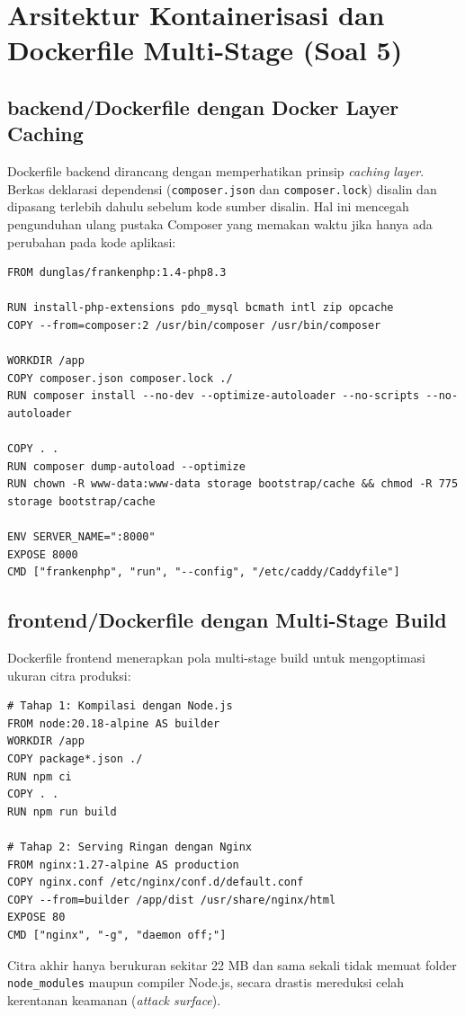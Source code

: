 \documentclass[a4paper,oneside,11pt]{book}
\begin{document}
\section{Arsitektur Kontainerisasi dan Dockerfile Multi-Stage (Soal 5)}

\subsection{backend/Dockerfile dengan Docker Layer Caching}
Dockerfile backend dirancang dengan memperhatikan prinsip \textit{caching layer}. Berkas deklarasi dependensi (\texttt{composer.json} dan \texttt{composer.lock}) disalin dan dipasang terlebih dahulu sebelum kode sumber disalin. Hal ini mencegah pengunduhan ulang pustaka Composer yang memakan waktu jika hanya ada perubahan pada kode aplikasi:
\begin{lstlisting}[style=codestyle]
FROM dunglas/frankenphp:1.4-php8.3

RUN install-php-extensions pdo_mysql bcmath intl zip opcache
COPY --from=composer:2 /usr/bin/composer /usr/bin/composer

WORKDIR /app
COPY composer.json composer.lock ./
RUN composer install --no-dev --optimize-autoloader --no-scripts --no-autoloader

COPY . .
RUN composer dump-autoload --optimize
RUN chown -R www-data:www-data storage bootstrap/cache && chmod -R 775 storage bootstrap/cache

ENV SERVER_NAME=":8000"
EXPOSE 8000
CMD ["frankenphp", "run", "--config", "/etc/caddy/Caddyfile"]
\end{lstlisting}

\subsection{frontend/Dockerfile dengan Multi-Stage Build}
Dockerfile frontend menerapkan pola multi-stage build untuk mengoptimasi ukuran citra produksi:
\begin{lstlisting}[style=codestyle]
# Tahap 1: Kompilasi dengan Node.js
FROM node:20.18-alpine AS builder
WORKDIR /app
COPY package*.json ./
RUN npm ci
COPY . .
RUN npm run build

# Tahap 2: Serving Ringan dengan Nginx
FROM nginx:1.27-alpine AS production
COPY nginx.conf /etc/nginx/conf.d/default.conf
COPY --from=builder /app/dist /usr/share/nginx/html
EXPOSE 80
CMD ["nginx", "-g", "daemon off;"]
\end{lstlisting}
Citra akhir hanya berukuran sekitar 22 MB dan sama sekali tidak memuat folder \texttt{node\_modules} maupun compiler Node.js, secara drastis mereduksi celah kerentanan keamanan (\textit{attack surface}).
\end{document}
